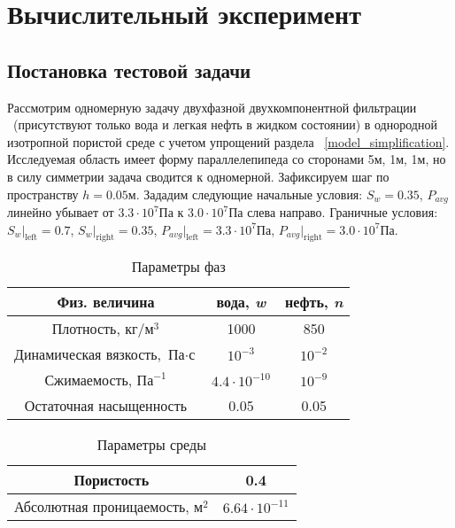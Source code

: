 \section{Вычислительный эксперимент}

\subsection{Постановка тестовой задачи}
\label{test_task}
Рассмотрим одномерную задачу двухфазной двухкомпонентной фильтрации ~(присутствуют только вода и легкая нефть в жидком состоянии)
в однородной изотропной пористой среде с учетом упрощений раздела ~\ref{model_simplification}.
Исследуемая область имеет форму параллелепипеда со сторонами 5м, 1м, 1м, но в силу симметрии задача сводится к одномерной.
Зафиксируем шаг по пространству $h=0.05\text{м}$.
Зададим следующие начальные условия: $S_w = 0.35$, $P_{avg}$ линейно убывает от $3.3\cdot 10^7$Па к $3.0\cdot 10^7$Па слева направо.
Граничные условия: $S_w|_{\text{left}} = 0.7$, $S_w|_{\text{right}} = 0.35$,
$P_{avg}|_{\text{left}} = 3.3\cdot 10^7$Па, $P_{avg}|_{\text{right}} = 3.0\cdot 10^7$Па.

\begin{table}[H]
\caption{Параметры фаз}
\label{tabular:liquids}
\begin{center}
\begin{tabular}{|c|c|c|}
\hline
Физ. величина & вода, \textit {w} & нефть, \textit {n} \\
\hline
Плотность,  $ {\text{кг}} / {\text{м}^3} $ & 1000 & 850 \\
\hline
Динамическая вязкость, $ \text{Па} \cdot \text{с} $ & $10^{-3}$ & $10^{-2}$ \\
\hline
Сжимаемость, $ \text{Па}^{-1}$ & $4.4 \cdot 10^{-10}$ & $10^{-9}$ \\
\hline
Остаточная насыщенность & 0.05 & 0.05 \\
\hline
\end{tabular}
\end{center}
\end{table}

\begin{table}[H]
\caption{Параметры среды}
\label{tabular:medium}
\begin{center}
\begin{tabular}{|c|c|}
\hline
Пористость & 0.4\\
\hline
Абсолютная проницаемость, $ \text{м}^{2}$ & $6.64 \cdot 10^{-11}$ \\
\hline
\end{tabular}
\end{center}
\end{table}


